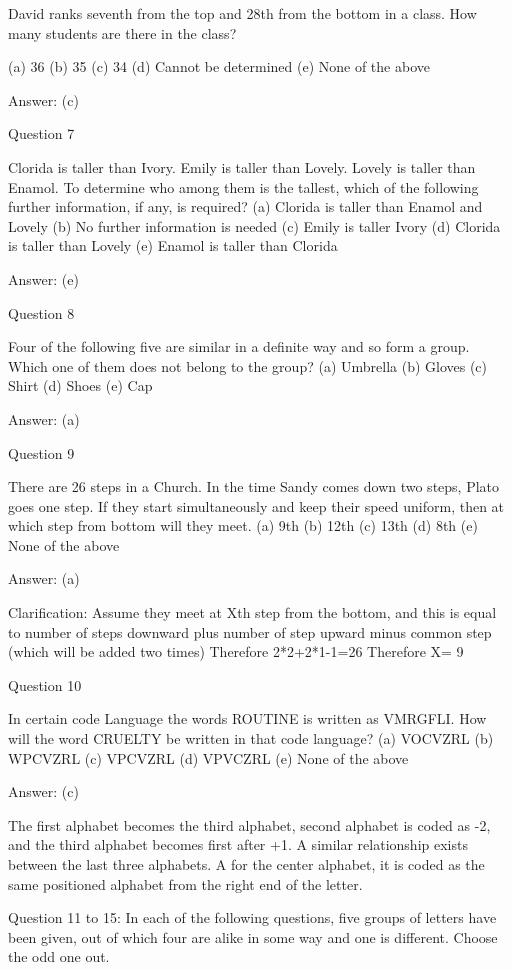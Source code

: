 David ranks seventh from the top and 28th from the bottom in a class. How many students are there in the class?

(a) 36
(b) 35
(c) 34
(d) Cannot be determined
(e) None of the above

Answer: (c)

Question 7

Clorida is taller than Ivory. Emily is taller than Lovely. Lovely is taller than Enamol. To determine who among them is the tallest, which of the following further information, if any, is required?
(a) Clorida is taller than Enamol and Lovely
(b) No further information is needed
(c) Emily is taller Ivory
(d) Clorida is taller than Lovely
(e) Enamol is taller than Clorida

Answer: (e)

Question 8

Four of the following five are similar in a definite way and so form a group. Which one of them does not belong to the group?
(a) Umbrella
(b) Gloves
(c) Shirt
(d) Shoes
(e) Cap

Answer: (a)

Question 9

There are 26 steps in a Church. In the time Sandy comes down two steps, Plato goes one step. If they start simultaneously and keep their speed uniform, then at which step from bottom will they meet.
(a) 9th
(b) 12th
(c) 13th
(d) 8th
(e) None of the above

Answer: (a)

Clarification: Assume they meet at Xth step from the bottom, and this is equal to number of steps downward plus number of step upward minus common step (which will be added two times)
Therefore 2*2+2*1-1=26
Therefore X= 9

Question 10

In certain code Language the words ROUTINE is written as VMRGFLI. How will the word CRUELTY be written in that code language?
(a) VOCVZRL
(b) WPCVZRL
(c) VPCVZRL
(d) VPVCZRL
(e) None of the above

Answer: (c)

The first alphabet becomes the third alphabet, second alphabet is coded as -2, and the third alphabet becomes first after +1. A similar relationship exists between the last three alphabets. A for the center alphabet, it is coded as the same positioned alphabet from the right end of the letter.



Question 11 to 15: In each of the following questions, five groups of letters have been given, out of which four are alike in some way and one is different. Choose the odd one out.

